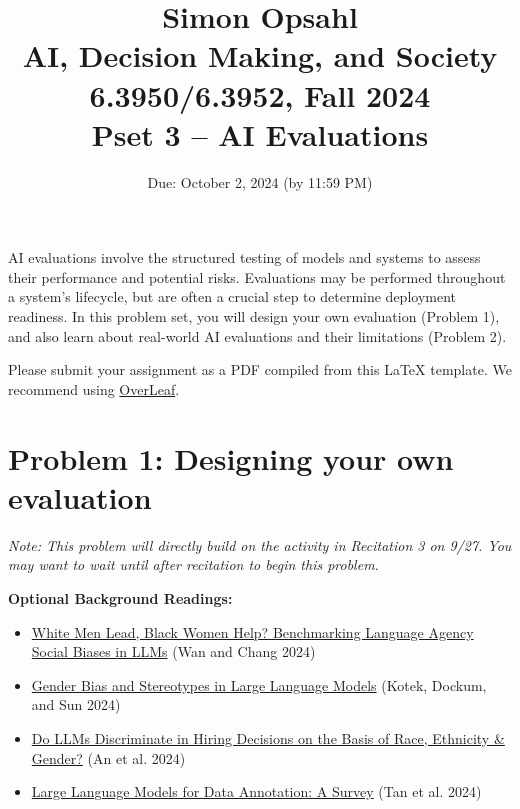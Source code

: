 \documentclass{article}
\title{\textbf{Simon Opsahl}\\AI, Decision Making, and Society\\6.3950/6.3952, Fall 2024\\Pset 3 -- AI Evaluations}
\begin{document}
\date{Due: October 2, 2024 (by 11:59 PM)}

\maketitle
\section*{}

AI evaluations involve the structured testing of models and systems to assess their performance and potential risks. Evaluations may be performed throughout a system's lifecycle, but are often a crucial step to determine deployment readiness. In this problem set, you will design your own evaluation (Problem 1), and also learn about real-world AI evaluations and their limitations (Problem 2). 

Please submit your assignment as a PDF compiled from this LaTeX template. We recommend using \href{https://www.overleaf.com/}{OverLeaf}. 





\newpage


\section*{Problem 1: Designing your own evaluation}
\textit{Note: This problem will directly build on the activity in Recitation 3 on 9/27. You may want to wait until after recitation to begin this problem.}

\bigskip 


\textbf{Optional Background Readings:}
\begin{itemize}
\item \href{https://arxiv.org/pdf/2404.10508}{White Men Lead, Black Women Help? Benchmarking Language Agency Social Biases in LLMs} (Wan and Chang 2024)
\item \href{https://dl.acm.org/doi/pdf/10.1145/3582269.3615599}{Gender Bias and Stereotypes in Large Language Models} (Kotek, Dockum, and Sun 2024)
\item \href{https://arxiv.org/pdf/2406.10486}{Do LLMs Discriminate in Hiring Decisions on the Basis of Race, Ethnicity \& Gender?} (An et al. 2024)
\item \href{https://arxiv.org/pdf/2402.13446}{Large Language Models for Data Annotation: A Survey} (Tan et al. 2024)
\end{itemize}

\bigskip
\end{document}
